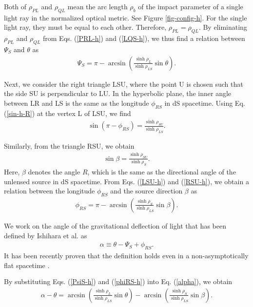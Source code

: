 \documentclass[twocolumn,showpacs,preprintnumbers,amsmath,amssymb]{revtex4-1}
\begin{document}
Both of $\rho_{PL}$ and $\rho_{QL}$ 
mean the arc length $\rho_b$ of the impact parameter 
of a single light ray in the normalized optical metric. 
See Figure \ref{fig-config-h}. 
For the single light ray, they must be equal to each other. 
Therefore, $\rho_{PL} = \rho_{QL}$. 
By eliminating $\rho_{PL}$ and $\rho_{QL}$ 
from Eqs. (\ref{PRL-h}) and (\ref{LQS-h}), 
we thus find a relation between $\Psi_S$ and $\theta$ as 
\begin{align}
\Psi_S 
= 
\pi - \arcsin\left(\frac{\sinh\rho_L}{\sinh\rho_{LS}}\sin\theta\right) .
\label{PsiS-h}
\end{align}

Next, we consider the right triangle LSU, 
where the point U is chosen 
such that the side SU is perpendicular to LU. 
In the hyperbolic plane, the inner angle between LR and LS 
is the same as the longitude $\phi_{RS}$ 
in dS spacetime. 
Using Eq. (\ref{sin-h-R}) at the vertex L of LSU, 
we find 
\begin{align}
\sin(\pi - \phi_{RS}) 
=
\frac{\sinh\rho_{SU}}{\sinh\rho_{LS}} . 
\label{LSU-h}
\end{align}

Similarly, from the triangle RSU, 
we obtain 
\begin{align}
\sin\beta 
=
\frac{\sinh\rho_{SU}}{\sinh\rho_S} . 
\label{RSU-h}
\end{align}
Here, 
$\beta$ denotes the angle $R$, which 
is the same as the directional angle of the unlensed source in dS spacetime. 
From Eqs. (\ref{LSU-h}) and (\ref{RSU-h}), 
we obtain a relation 
between the longitude $\phi_{RS}$ and the source direction $\beta$ as 
\begin{align}
\phi_{RS} 
= 
\pi - \arcsin\left(\frac{\sinh\rho_S}{\sinh\rho_{LS}}\sin\beta\right) .
\label{phiRS-h}
\end{align}

We work on 
the angle of the gravitational deflection of light 
that has been defined by Ishihara et al. as \cite{Ishihara2016} 
\begin{align}
\alpha \equiv \theta -\Psi_S + \phi_{RS} .
\label{alpha}
\end{align}
It  has been recently proven that 
the definition holds even in a non-asymptotically flat spacetime 
\cite{Takizawa2020b}. 

By substituting Eqs. (\ref{PsiS-h}) and (\ref{phiRS-h}) into Eq. (\ref{alpha}), 
we obtain 
\begin{align}
\alpha - \theta 
= 
\arcsin\left(\frac{\sinh\rho_L}{\sinh\rho_{LS}}\sin\theta\right)
- \arcsin\left(\frac{\sinh\rho_S}{\sinh\rho_{LS}}\sin\beta\right) . 
\label{lenseq-dS}
\end{align}
\end{document}
